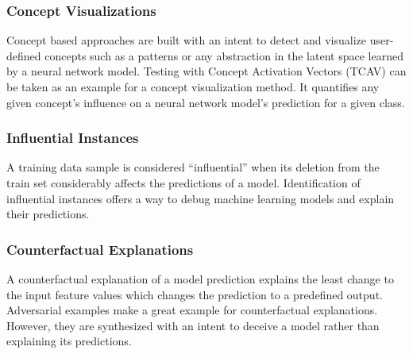 \documentclass[../report.tex]{subfiles}
\begin{document}
	
	\subsubsection{Concept Visualizations}
	Concept based approaches are built with an intent to detect and visualize user-defined concepts such as a patterns or any abstraction in the latent space learned by a neural network model.  Testing with Concept Activation Vectors (TCAV) \cite{tcav} can be taken as an example for a concept visualization method. It quantifies any given concept's influence on a neural network model's prediction for a given class.
	
	\subsubsection{Influential Instances}
	A training data sample is considered \enquote{influential} when its deletion from the train set considerably affects the predictions of a model. Identification of influential instances offers a way to debug machine learning models and explain their predictions.
	
	\subsubsection{Counterfactual Explanations}
	A counterfactual explanation of a model prediction explains the least change to the input feature values which changes the prediction to a predefined output. Adversarial examples \cite{} make a great example for counterfactual explanations. However, they are synthesized with an intent to deceive a model rather than explaining its predictions.
\end{document}
